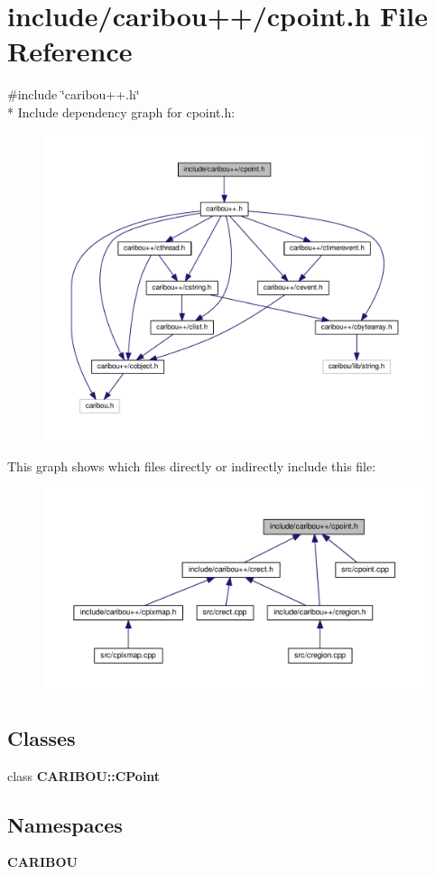 \section{include/caribou++/cpoint.h File Reference}
\label{cpoint_8h}
{\ttfamily \#include \char`\"{}caribou++.\-h\char`\"{}}\\*
Include dependency graph for cpoint.\-h\-:\nopagebreak
\begin{figure}[H]
\begin{center}
\leavevmode
\includegraphics[width=350pt]{cpoint_8h__incl}
\end{center}
\end{figure}
This graph shows which files directly or indirectly include this file\-:\nopagebreak
\begin{figure}[H]
\begin{center}
\leavevmode
\includegraphics[width=350pt]{cpoint_8h__dep__incl}
\end{center}
\end{figure}
\subsection*{Classes}
\begin{DoxyCompactItemize}
\item 
class {\bf C\-A\-R\-I\-B\-O\-U\-::\-C\-Point}
\end{DoxyCompactItemize}
\subsection*{Namespaces}
\begin{DoxyCompactItemize}
\item 
{\bf C\-A\-R\-I\-B\-O\-U}
\end{DoxyCompactItemize}

